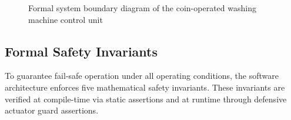 \begin{figure}[H]
{%
  }
  \caption{Formal system boundary diagram of the coin-operated washing machine control unit}
  \label{fig:sys-boundary}
\end{figure}

\subsection{Formal Safety Invariants}
\label{sec:invariants}

To guarantee fail-safe operation under all operating conditions, the software architecture enforces
five mathematical safety invariants. These invariants are verified at compile-time via static assertions
and at runtime through defensive actuator guard assertions.


